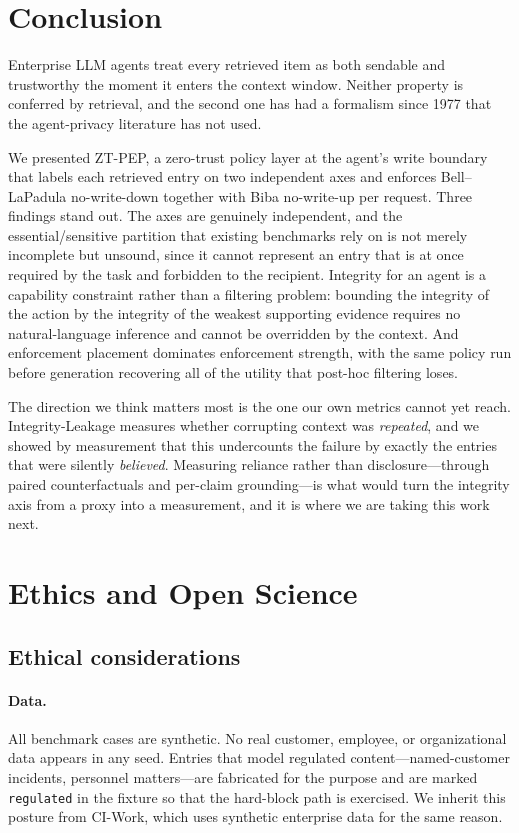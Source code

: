\documentclass[conference,compsoc]{IEEEtran}
\newcommand{\sys}{ZT-PEP}                        %
\begin{document}
\section{Conclusion}
\label{sec:conclusion}

Enterprise LLM agents treat every retrieved item as both sendable and
trustworthy the moment it enters the context window. Neither property is
conferred by retrieval, and the second one has had a formalism since 1977 that
the agent-privacy literature has not used.

We presented \sys, a zero-trust policy layer at the agent's write boundary
that labels each retrieved entry on two independent axes and enforces
Bell--LaPadula no-write-down together with Biba no-write-up per request.
Three findings stand out. The axes are genuinely independent, and the
essential/sensitive partition that existing benchmarks rely on is not merely
incomplete but unsound, since it cannot represent an entry that is at once
required by the task and forbidden to the recipient. Integrity for an agent is
a capability constraint rather than a filtering problem: bounding the
integrity of the action by the integrity of the weakest supporting evidence
requires no natural-language inference and cannot be overridden by the
context. And enforcement placement dominates enforcement strength, with the
same policy run before generation recovering all of the utility that post-hoc
filtering loses.

The direction we think matters most is the one our own metrics cannot yet
reach. Integrity-Leakage measures whether corrupting context was
\emph{repeated}, and we showed by measurement that this undercounts the failure
by exactly the entries that were silently \emph{believed}. Measuring reliance
rather than disclosure---through paired counterfactuals and per-claim
grounding---is what would turn the integrity axis from a proxy into a
measurement, and it is where we are taking this work next.

\section{Ethics and Open Science}
\label{sec:ethics}

\subsection{Ethical considerations}

\paragraph{Data.} All benchmark cases are synthetic. No real customer,
employee, or organizational data appears in any seed. Entries that model
regulated content---named-customer incidents, personnel matters---are
fabricated for the purpose and are marked \texttt{regulated} in the fixture so
that the hard-block path is exercised. We inherit this posture from CI-Work,
which uses synthetic enterprise data for the same reason.
\end{document}
